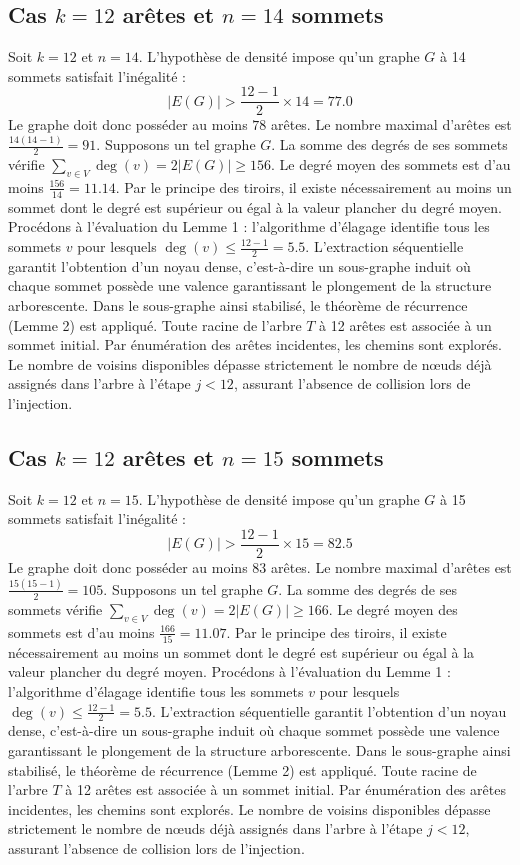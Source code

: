 \documentclass[12pt,a4paper]{article}
\begin{document}
\subsection{Cas $k = 12$ arêtes et $n = 14$ sommets}
Soit $k = 12$ et $n = 14$. L'hypothèse de densité impose qu'un graphe $G$ à 14 sommets satisfait l'inégalité :
$$ |E(G)| > \frac{12-1}{2} \times 14 = 77.0 $$
Le graphe doit donc posséder au moins $78$ arêtes. Le nombre maximal d'arêtes est $\frac{14(14-1)}{2} = 91$.
Supposons un tel graphe $G$. La somme des degrés de ses sommets vérifie $\sum_{v \in V} \deg(v) = 2|E(G)| \geq 156$.
Le degré moyen des sommets est d'au moins $\frac{156}{14} = 11.14$.
Par le principe des tiroirs, il existe nécessairement au moins un sommet dont le degré est supérieur ou égal à la valeur plancher du degré moyen.
Procédons à l'évaluation du Lemme 1 : l'algorithme d'élagage identifie tous les sommets $v$ pour lesquels $\deg(v) \leq \frac{12-1}{2} = 5.5$.
L'extraction séquentielle garantit l'obtention d'un noyau dense, c'est-à-dire un sous-graphe induit où chaque sommet possède une valence garantissant le plongement de la structure arborescente.
Dans le sous-graphe ainsi stabilisé, le théorème de récurrence (Lemme 2) est appliqué. Toute racine de l'arbre $T$ à 12 arêtes est associée à un sommet initial. Par énumération des arêtes incidentes, les chemins sont explorés. Le nombre de voisins disponibles dépasse strictement le nombre de nœuds déjà assignés dans l'arbre à l'étape $j < 12$, assurant l'absence de collision lors de l'injection.

\subsection{Cas $k = 12$ arêtes et $n = 15$ sommets}
Soit $k = 12$ et $n = 15$. L'hypothèse de densité impose qu'un graphe $G$ à 15 sommets satisfait l'inégalité :
$$ |E(G)| > \frac{12-1}{2} \times 15 = 82.5 $$
Le graphe doit donc posséder au moins $83$ arêtes. Le nombre maximal d'arêtes est $\frac{15(15-1)}{2} = 105$.
Supposons un tel graphe $G$. La somme des degrés de ses sommets vérifie $\sum_{v \in V} \deg(v) = 2|E(G)| \geq 166$.
Le degré moyen des sommets est d'au moins $\frac{166}{15} = 11.07$.
Par le principe des tiroirs, il existe nécessairement au moins un sommet dont le degré est supérieur ou égal à la valeur plancher du degré moyen.
Procédons à l'évaluation du Lemme 1 : l'algorithme d'élagage identifie tous les sommets $v$ pour lesquels $\deg(v) \leq \frac{12-1}{2} = 5.5$.
L'extraction séquentielle garantit l'obtention d'un noyau dense, c'est-à-dire un sous-graphe induit où chaque sommet possède une valence garantissant le plongement de la structure arborescente.
Dans le sous-graphe ainsi stabilisé, le théorème de récurrence (Lemme 2) est appliqué. Toute racine de l'arbre $T$ à 12 arêtes est associée à un sommet initial. Par énumération des arêtes incidentes, les chemins sont explorés. Le nombre de voisins disponibles dépasse strictement le nombre de nœuds déjà assignés dans l'arbre à l'étape $j < 12$, assurant l'absence de collision lors de l'injection.
\end{document}
